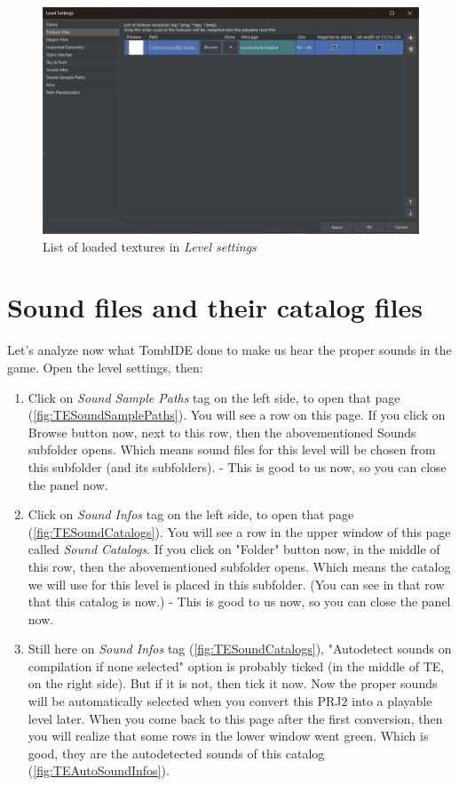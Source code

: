 \begin{figure}
    \centering
     \includegraphics[width=1\textwidth]{screenshots/1005.png}
     \caption{List of loaded textures in \emph{Level settings}}
     \label{fig:TETextureSettings} 
\end{figure}

\chapter{Sound files and their catalog files}
Let's analyze now what TombIDE done to make us hear the proper sounds in the game. Open the level settings, then:
\begin{enumerate}
    \item Click on \emph{Sound Sample Paths} tag on the left side, to open that page (\ref{fig:TESoundSamplePaths}). You will see a row on this page. If you click on Browse button now, next to this row, then the abovementioned Sounds subfolder opens. Which means sound files for this level will be chosen from this subfolder (and its subfolders). - This is good to us now, so you can close the panel now.
    \item Click on \emph{Sound Infos} tag on the left side, to open that page (\ref{fig:TESoundCatalogs}). You will see a row in the upper window of this page called \emph{Sound Catalogs}. If you click on "Folder" button now, in the middle of this row, then the abovementioned  subfolder opens. Which means the catalog we will use for this level is placed in this subfolder. (You can see in that row that this catalog is  now.) - This is good to us now, so you can close the panel now.
    \item Still here on \emph{Sound Infos} tag (\ref{fig:TESoundCatalogs}), "Autodetect sounds on compilation if none selected" option is probably ticked (in the middle of TE, on the right side). But if it is not, then tick it now. Now the proper sounds will be automatically selected when you convert this PRJ2 into a playable level later. When you come back to this page after the first conversion, then you will realize that some rows in the lower window went green. Which is good, they are the autodetected sounds of this catalog (\ref{fig:TEAutoSoundInfos}).
\end{enumerate}

